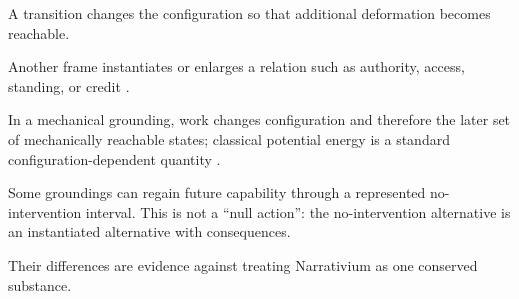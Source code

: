 \documentclass[11pt,a4paper]{article}
\theoremstyle{remark}
\begin{document}
\begin{description}[leftmargin=*,style=nextline]
\item[Acquisition.] A transition changes the configuration so that additional deformation becomes reachable.
\item[Conferral.] Another frame instantiates or enlarges a relation such as authority, access, standing, or credit \citep{bourdieu1986forms,coleman1988social}.
\item[Work against a field.] In a mechanical grounding, work changes configuration and therefore the later set of mechanically reachable states; classical potential energy is a standard configuration-dependent quantity \citep{goldstein2002mechanics}.
\item[Cessation.] Some groundings can regain future capability through a represented no-intervention interval. This is not a ``null action'': the no-intervention alternative is an instantiated alternative with consequences.
\end{description}

Their differences are evidence against treating Narrativium as one conserved substance.
\end{document}

